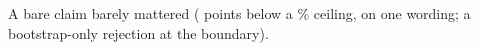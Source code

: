 A bare claim barely mattered (\wtthHaikuHOneDelta{} points below a \wtthHaikuPOneNonePct\% ceiling, on one wording; a bootstrap-only rejection at the boundary).
